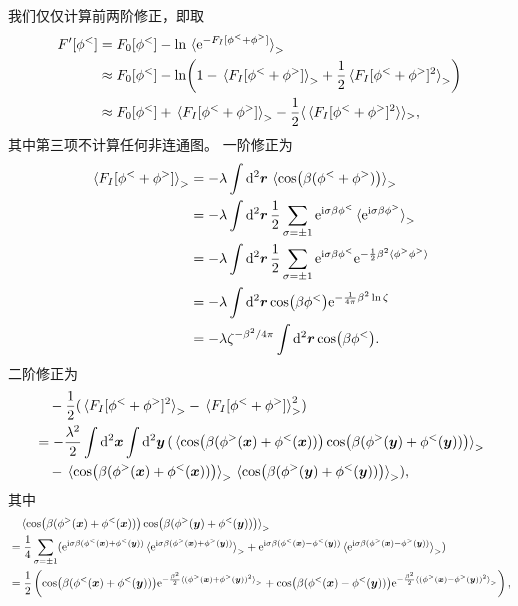 \documentclass[hyperref, UTF8, a4paper]{ctexart}
\newcommand*{\ii}{\mathrm{i}}
\newcommand*{\ee}{\mathrm{e}}
\begin{document}
我们仅仅计算前两阶修正，即取
\[
    \begin{aligned}
        F'[\phi^<] &= F_0[\phi^<] - \ln \expval*{\ee^{-F_I[\phi^< +  \phi^>]}}_> \\
        &\approx F_0[\phi^<] - \ln(1 - \expval*{F_I[\phi^<+\phi^>]}_> + \frac{1}{2} \expval*{F_I[\phi^<+\phi^>]^2}_>) \\
        &\approx F_0[\phi^<] + \expval*{F_I[\phi^<+\phi^>]}_> - \frac{1}{2} \langle \expval*{F_I[\phi^<+\phi^>]^2} \rangle_>,
    \end{aligned}
\]
其中第三项不计算任何非连通图。
一阶修正为
\[
    \begin{aligned}
        \expval*{F_I[\phi^< + \phi^>]}_> &= - \lambda \int \dd[2]{\vb*{r}} \expval*{\cos(\beta (\phi^< + \phi^>))}_> \\
        &= - \lambda \int \dd[2]{\vb*{r}} \frac{1}{2} \sum_{\sigma=\pm 1} \ee^{\ii \sigma \beta \phi^<} \expval*{\ee^{\ii \sigma \beta \phi^>}}_> \\
        &= - \lambda \int \dd[2]{\vb*{r}} \frac{1}{2} \sum_{\sigma=\pm 1} \ee^{\ii \sigma \beta \phi^<} \ee^{- \frac{1}{2} \beta^2 \expval*{\phi^> \phi^>} } \\
        &= - \lambda \int \dd[2]{\vb*{r}} \cos(\beta \phi^<) \ee^{- \frac{1}{4\pi} \beta^2 \ln \zeta} \\
        &= - \lambda \zeta^{- \beta^2/ 4 \pi} \int \dd[2]{\vb*{r}} \cos(\beta \phi^<) .
    \end{aligned}
\]
二阶修正为
\[
    \begin{aligned}
        &\quad - \frac{1}{2} (\expval*{F_I[\phi^<+\phi^>]^2}_> - \expval*{F_I[\phi^<+\phi^>]}_>^2) \\
        &= - \frac{\lambda^2}{2} \int \dd[2]{\vb*{x}} \int \dd[2]{\vb*{y}} ( \expval*{\cos(\beta (\phi^>(\vb*{x}) + \phi^<(\vb*{x}))) \cos(\beta (\phi^>(\vb*{y}) + \phi^<(\vb*{y})))}_> \\
        &\quad - \expval*{\cos(\beta (\phi^>(\vb*{x}) + \phi^<(\vb*{x})))}_> \expval*{\cos(\beta (\phi^>(\vb*{y}) + \phi^<(\vb*{y})))}_> ),
    \end{aligned}
\]
其中
\[
    \begin{aligned}
        &\quad \expval*{\cos(\beta (\phi^>(\vb*{x}) + \phi^<(\vb*{x}))) \cos(\beta (\phi^>(\vb*{y}) + \phi^<(\vb*{y})))}_> \\
        &= \frac{1}{4} \sum_{\sigma=\pm 1} (\ee^{\ii \sigma \beta (\phi^<(\vb*{x}) + \phi^<(\vb*{y}))} \expval*{\ee^{\ii \sigma \beta (\phi^>(\vb*{x}) + \phi^>(\vb*{y}))}}_> + \ee^{\ii \sigma \beta (\phi^<(\vb*{x}) - \phi^<(\vb*{y}))} \expval*{\ee^{\ii \sigma \beta (\phi^>(\vb*{x}) - \phi^>(\vb*{y}))}}_>) \\
        &= \frac{1}{2} \left( \cos(\beta (\phi^<(\vb*{x}) + \phi^<(\vb*{y}))) \ee^{- \frac{\beta^2}{2} \expval*{(\phi^>(\vb*{x}) + \phi^>(\vb*{y}))^2}_>} + \cos(\beta (\phi^<(\vb*{x}) - \phi^<(\vb*{y}))) \ee^{- \frac{\beta^2}{2} \expval*{(\phi^>(\vb*{x}) - \phi^>(\vb*{y}))^2}_>} \right),
    \end{aligned}
\]
\end{document}
